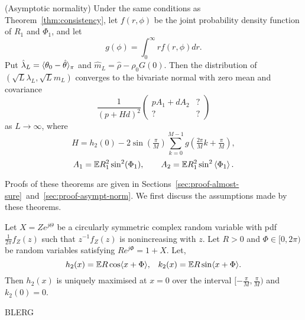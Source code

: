 \documentclass[journal]{IEEEtran}
\begin{document}
\begin{theorem}\label{thm:normality} (Asymptotic normality)
Under the same conditions as Theorem~\ref{thm:consistency}, let $f(r,\phi)$ be the joint probability density function of $R_1$ and $\Phi_1$, and let
\[
g(\phi) = \int_{0}^{\infty} r f(r,\phi) dr.
\]
Put $\hat{\lambda}_L = \langle \theta_0 - \hat{\theta} \rangle_\pi$ and $\hat{m}_L = \hat{\rho} - \rho_0 G(0)$. %
Then the distribution of $(\sqrt{L}\lambda_L, \sqrt{L}m_L)$ converges to the bivariate normal with zero mean and covariance
\[
\frac{1}{(p + H d)^2} \left( \begin{array}{cc} 
pA_1 + dA_2 & ? \\
? & ?
\end{array} \right)
\]
as $L \rightarrow \infty$, where
\[
H = h_2(0) -  2 \sin(\tfrac{\pi}{M}) \sum_{k = 0}^{M-1} g(\tfrac{2\pi}{M}k + \tfrac{\pi}{M}),
\]
\[
A_1 = {\mathbb E} R_1^2\sin^2(\Phi_1), \qquad A_2 = {\mathbb E} R_1^2\sin^2\left\langle \Phi_1 \right\rangle.
\]
\end{theorem}



Proofs of these theorems are given in Sections~\ref{sec:proof-almost-sure}~and~\ref{sec:proof-asympt-norm}.  We first discuss the assumptions made by these theorems. 

\begin{lemma}
Let $X = Z e^{j\Theta}$ be a circularly symmetric complex random variable with pdf $\tfrac{1}{2\pi}f_Z(z)$ such that $z^{-1} f_Z(z)$ is nonincreasing with $z$.  Let $R > 0$ and $\Phi \in [0, 2\pi)$ be random variables satisfying $R e^{j\Phi} = 1 + X$.  Let,
\[
h_2(x) = {\mathbb E} R \cos\langle x + \Phi \rangle, \;\;\; k_2(x) =  {\mathbb E} R \sin\langle  x + \Phi \rangle.
\]
Then $h_2(x)$ is uniquely maximised at $x=0$ over the interval $[-\tfrac{\pi}{M},\tfrac{\pi}{M})$ and $k_2(0) = 0$.
\end{lemma}
\begin{IEEEproof}
BLERG
\end{IEEEproof}
\end{document}
